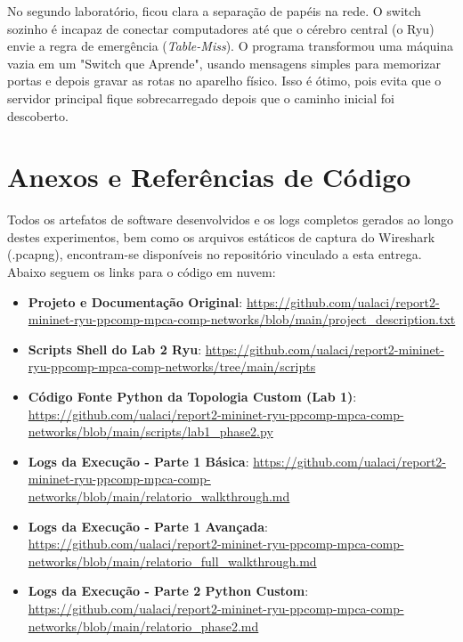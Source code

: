\documentclass[12pt,a4paper]{article}
\begin{document}
No segundo laboratório, ficou clara a separação de papéis na rede. O switch sozinho é incapaz de conectar computadores até que o cérebro central (o Ryu) envie a regra de emergência (\textit{Table-Miss}). O programa transformou uma máquina vazia em um "Switch que Aprende", usando mensagens simples para memorizar portas e depois gravar as rotas no aparelho físico. Isso é ótimo, pois evita que o servidor principal fique sobrecarregado depois que o caminho inicial foi descoberto.

\section{Anexos e Referências de Código}

Todos os artefatos de software desenvolvidos e os logs completos gerados ao longo destes experimentos, bem como os arquivos estáticos de captura do Wireshark (.pcapng), encontram-se disponíveis no repositório vinculado a esta entrega. Abaixo seguem os links para o código em nuvem:

\begin{itemize}
    \item \textbf{Projeto e Documentação Original}: \url{https://github.com/ualaci/report2-mininet-ryu-ppcomp-mpca-comp-networks/blob/main/project_description.txt}
    \item \textbf{Scripts Shell do Lab 2 Ryu}: \url{https://github.com/ualaci/report2-mininet-ryu-ppcomp-mpca-comp-networks/tree/main/scripts}
    \item \textbf{Código Fonte Python da Topologia Custom (Lab 1)}: \url{https://github.com/ualaci/report2-mininet-ryu-ppcomp-mpca-comp-networks/blob/main/scripts/lab1_phase2.py}
    \item \textbf{Logs da Execução - Parte 1 Básica}: \url{https://github.com/ualaci/report2-mininet-ryu-ppcomp-mpca-comp-networks/blob/main/relatorio_walkthrough.md}
    \item \textbf{Logs da Execução - Parte 1 Avançada}: \url{https://github.com/ualaci/report2-mininet-ryu-ppcomp-mpca-comp-networks/blob/main/relatorio_full_walkthrough.md}
    \item \textbf{Logs da Execução - Parte 2 Python Custom}: \url{https://github.com/ualaci/report2-mininet-ryu-ppcomp-mpca-comp-networks/blob/main/relatorio_phase2.md}
\end{itemize}
\end{document}
